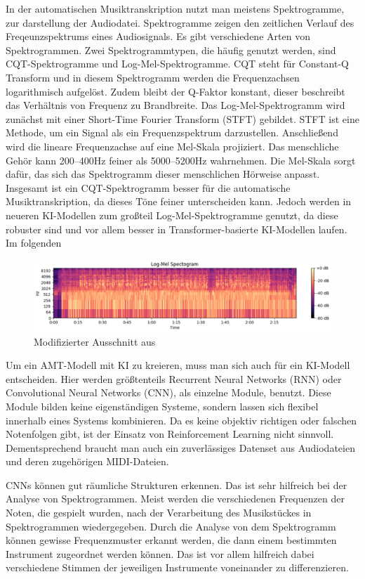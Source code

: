 In der automatischen Musiktranskription nutzt man meistens Spektrogramme, zur darstellung der Audiodatei.
Spektrogramme zeigen den zeitlichen Verlauf des Freqeunzspektrums eines Audiosignals.
Es gibt verschiedene Arten von Spektrogrammen.
Zwei Spektrogrammtypen, die häufig genutzt werden, sind CQT-Spektrogramme und Log-Mel-Spektrogramme.
CQT steht für Constant-Q Transform und in diesem Spektrogramm werden die Frequenzachsen logarithmisch aufgelöst.
Zudem bleibt der Q-Faktor konstant, dieser beschreibt das Verhältnis von Frequenz zu Brandbreite.
Das Log-Mel-Spektrogramm wird zunächst mit einer Short-Time Fourier Transform (STFT) gebildet.
STFT ist eine Methode, um ein Signal als ein Frequenzspektrum darzustellen.
Anschließend wird die lineare Frequenzachse auf eine Mel-Skala projiziert.
Das menschliche Gehör kann 200--400Hz feiner als 5000--5200Hz wahrnehmen.
Die Mel-Skala sorgt dafür, das sich das Spektrogramm dieser menschlichen Hörweise anpasst.
Insgesamt ist ein CQT-Spektrogramm besser für die automatische Musiktranskription,
da dieses Töne feiner unterscheiden kann.
Jedoch werden in neueren KI-Modellen zum großteil Log-Mel-Spektrogramme genutzt,
da diese robuster sind und vor allem besser in Transformer-basierte KI-Modellen laufen.
Im folgenden
\begin{figure}[H]
    \centering
    \includegraphics[width=1\textwidth]{Graphics/logMelSpek}
    \caption{Modifizierter Ausschnitt aus \cite{pyrovolakis2022multimodal}}
    \label{fig:mel-vs-logmel-mfcc}
\end{figure}

Um ein AMT-Modell mit KI zu kreieren, muss man sich auch für ein KI-Modell entscheiden.
Hier werden größtenteils Recurrent Neural Networks (RNN) oder Convolutional Neural Networks (CNN),
als einzelne Module, benutzt.
\cite{Boeck2012}
Diese Module bilden keine eigenständigen Systeme, sondern lassen sich flexibel innerhalb eines Systems kombinieren.
Da es keine objektiv richtigen oder falschen Notenfolgen gibt, ist der Einsatz von Reinforcement Learning nicht sinnvoll.
Dementsprechend braucht man auch ein zuverlässiges Datenset aus Audiodateien und deren zugehörigen MIDI-Dateien.

CNNs können gut räumliche Strukturen erkennen.
Das ist sehr hilfreich bei der Analyse von Spektrogrammen.
Meist werden die verschiedenen Frequenzen der Noten, die gespielt wurden,
nach der Verarbeitung des Musikstückes in Spektrogrammen wiedergegeben.
Durch die Analyse von dem Spektrogramm können gewisse Frequenzmuster erkannt werden,
die dann einem bestimmten Instrument zugeordnet werden können.
Das ist vor allem hilfreich dabei verschiedene Stimmen der jeweiligen Instrumente voneinander zu differenzieren.
\cite{han2016deep}

